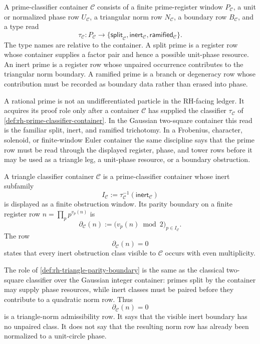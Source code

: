 \begin{definition}
\label{def:rh-prime-classifier-container}
A prime-classifier container $\mathcal C$ consists of a finite
prime-register window $P_{\mathcal C}$, a unit or normalized phase row
$U_{\mathcal C}$, a triangular norm row $N_{\mathcal C}$, a boundary row
$B_{\mathcal C}$, and a type read
$$
\tau_{\mathcal C}:P_{\mathcal C}\to
\{
\mathsf{split}_{\mathcal C},
\mathsf{inert}_{\mathcal C},
\mathsf{ramified}_{\mathcal C}
\}.
$$
The type names are relative to the container. A split prime is a register
row whose container supplies a factor pair and hence a possible
unit-phase resource. An inert prime is a register row whose unpaired
occurrence contributes to the triangular norm boundary. A ramified prime
is a branch or degeneracy row whose contribution must be recorded as
boundary data rather than erased into phase.
\end{definition}

\begin{principle}
\label{prin:rh-prime-type-container-relative}
A rational prime is not an undifferentiated particle in the RH-facing
ledger. It acquires its proof role only after a container $\mathcal C$
has supplied the classifier
$\tau_{\mathcal C}$ of \autoref{def:rh-prime-classifier-container}. In
the Gaussian two-square container this read is the familiar split,
inert, and ramified trichotomy. In a Frobenius, character, solenoid, or
finite-window Euler container the same discipline says that the prime
row must be read through the displayed register, phase, and tower rows
before it may be used as a triangle leg, a unit-phase resource, or a
boundary obstruction.
\end{principle}

\begin{definition}
\label{def:rh-triangle-parity-boundary}
A triangle classifier container $\mathcal C$ is a prime-classifier
container whose inert subfamily
$$
I_{\mathcal C}
:=
\tau_{\mathcal C}^{-1}(\mathsf{inert}_{\mathcal C})
$$
is displayed as a finite obstruction window. Its parity boundary on a
finite register row
$n=\prod_p p^{v_p(n)}$ is
$$
\partial_{\mathcal C}(n)
:=
\bigl(v_p(n)\bmod 2\bigr)_{p\in I_{\mathcal C}}.
$$
The row
$$
\partial_{\mathcal C}(n)=0
$$
states that every inert obstruction class visible to $\mathcal C$ occurs
with even multiplicity.
\end{definition}

\begin{principle}
\label{prin:rh-even-parity-triangle-norm-closure}
The role of \autoref{def:rh-triangle-parity-boundary} is the same as the
classical two-square classifier over the Gaussian integer container:
primes split by the container may supply phase resources, while inert
classes must be paired before they contribute to a quadratic norm row.
Thus
$$
\partial_{\mathcal C}(n)=0
$$
is a triangle-norm admissibility row. It says that the visible inert
boundary has no unpaired class. It does not say that the resulting
norm row has already been normalized to a unit-circle phase.
\end{principle}

